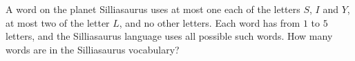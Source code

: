 A word on the planet Silliasaurus uses at most one each of the letters $S$, $I$ and $Y$, at most two of the letter $L$, and no other letters. Each word has from $1$ to $5$ letters, and the Silliasaurus language uses all possible such words. How many words are in the Silliasaurus vocabulary?
